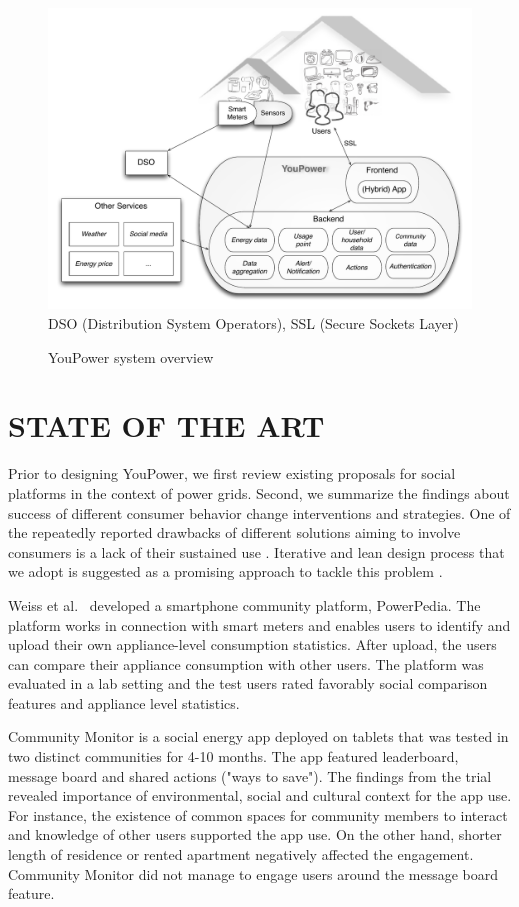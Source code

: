 \begin{figure}[t!]
\begin{center}\footnotesize
	\includegraphics[width=.7\textwidth]{img/civis_platform_overview.pdf}\\
	DSO (Distribution System Operators),  SSL (Secure Sockets Layer)
	\caption{YouPower system overview}\label{fig:platform}
\end{center}
\end{figure}

\section{\uppercase{State of the Art}}

\noindent Prior to designing YouPower, we first review existing proposals for social platforms in the context of power grids. Second, we summarize the findings about success of different consumer behavior change interventions and strategies. One of the repeatedly reported drawbacks of different solutions aiming to involve consumers is a lack of their sustained use \cite{edward2015review}. Iterative and lean design process that we adopt is suggested as a promising approach to tackle this problem \cite{schwartz2014people}.

Weiss et al.~\cite{weiss2012powerpedia} developed a smartphone community platform, PowerPedia. The platform works in connection with smart meters and enables users to identify and upload their own appliance-level consumption statistics. After upload, the users can compare their appliance consumption with other users. The platform was evaluated in a lab setting and the test users rated favorably social comparison features and appliance level statistics.

Community Monitor \cite{dillahunt2014understanding} is a social energy app deployed on tablets that was tested in two distinct communities for 4-10 months. The app featured leaderboard, message board and shared actions ("ways to save"). The findings from the trial revealed importance of environmental, social and cultural context for the app use. For instance, the existence of common spaces for community members to interact and knowledge of other users supported the app use. On the other hand, shorter length of residence or rented apartment negatively affected the engagement. Community Monitor did not manage to engage users around the message board feature.

